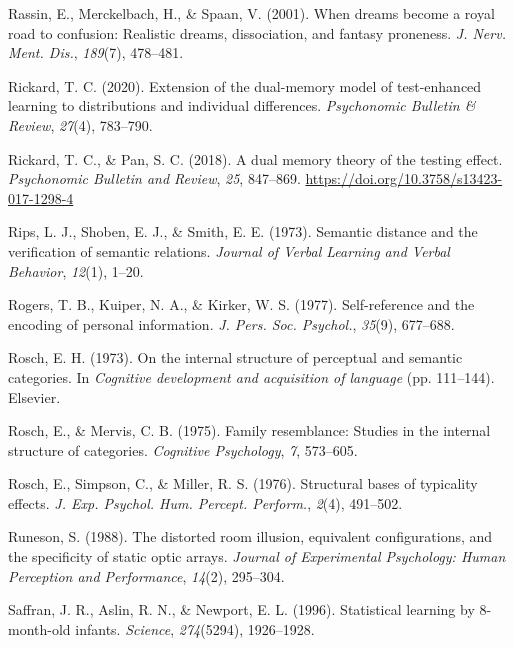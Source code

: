 \documentclass[
]{krantz}
\newlength{\cslhangindent}
\newlength{\cslentryspacingunit} %
\newenvironment{CSLReferences}[2] %
 {%
  \setlength{\parindent}{0pt}
  \ifodd #1
  \let\oldpar\par
  \def\par{\hangindent=\cslhangindent\oldpar}
  \fi
  \setlength{\parskip}{#2\cslentryspacingunit}
 }%
 {}
\begin{document}
\begin{CSLReferences}{1}{0}
\leavevmode{}%
Rassin, E., Merckelbach, H., \& Spaan, V. (2001). When dreams become a royal road to confusion: Realistic dreams, dissociation, and fantasy proneness. \emph{J. Nerv. Ment. Dis.}, \emph{189}(7), 478--481.

\leavevmode{}%
Rickard, T. C. (2020). Extension of the dual-memory model of test-enhanced learning to distributions and individual differences. \emph{Psychonomic Bulletin \& Review}, \emph{27}(4), 783--790.

\leavevmode{}%
Rickard, T. C., \& Pan, S. C. (2018). A dual memory theory of the testing effect. \emph{Psychonomic Bulletin and Review}, \emph{25}, 847--869. \url{https://doi.org/10.3758/s13423-017-1298-4}

\leavevmode{}%
Rips, L. J., Shoben, E. J., \& Smith, E. E. (1973). Semantic distance and the verification of semantic relations. \emph{Journal of Verbal Learning and Verbal Behavior}, \emph{12}(1), 1--20.

\leavevmode{}%
Rogers, T. B., Kuiper, N. A., \& Kirker, W. S. (1977). Self-reference and the encoding of personal information. \emph{J. Pers. Soc. Psychol.}, \emph{35}(9), 677--688.

\leavevmode{}%
Rosch, E. H. (1973). On the internal structure of perceptual and semantic categories. In \emph{Cognitive development and acquisition of language} (pp. 111--144). Elsevier.

\leavevmode{}%
Rosch, E., \& Mervis, C. B. (1975). Family resemblance: Studies in the internal structure of categories. \emph{Cognitive Psychology}, \emph{7}, 573--605.

\leavevmode{}%
Rosch, E., Simpson, C., \& Miller, R. S. (1976). Structural bases of typicality effects. \emph{J. Exp. Psychol. Hum. Percept. Perform.}, \emph{2}(4), 491--502.

\leavevmode{}%
Runeson, S. (1988). The distorted room illusion, equivalent configurations, and the specificity of static optic arrays. \emph{Journal of Experimental Psychology: Human Perception and Performance}, \emph{14}(2), 295--304.

\leavevmode{}%
Saffran, J. R., Aslin, R. N., \& Newport, E. L. (1996). Statistical learning by 8-month-old infants. \emph{Science}, \emph{274}(5294), 1926--1928.


\end{CSLReferences}
\end{document}
